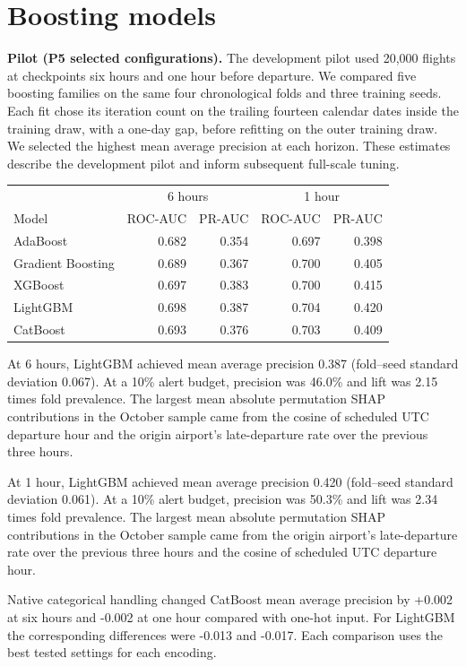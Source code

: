 \documentclass{article}
\begin{document}
\section{Boosting models}
\textbf{Pilot (P5 selected configurations).}
The development pilot used 20,000 flights at checkpoints six hours and one hour before departure. We compared five boosting families on the same four chronological folds and three training seeds. Each fit chose its iteration count on the trailing fourteen calendar dates inside the training draw, with a one-day gap, before refitting on the outer training draw. We selected the highest mean average precision at each horizon. These estimates describe the development pilot and inform subsequent full-scale tuning.

\begin{center}
\begin{tabular}{lrrrr}
 & \multicolumn{2}{c}{6 hours} & \multicolumn{2}{c}{1 hour} \\
Model & ROC-AUC & PR-AUC & ROC-AUC & PR-AUC \\ \hline
AdaBoost & 0.682 & 0.354 & 0.697 & 0.398 \\
Gradient Boosting & 0.689 & 0.367 & 0.700 & 0.405 \\
XGBoost & 0.697 & 0.383 & 0.700 & 0.415 \\
LightGBM & 0.698 & 0.387 & 0.704 & 0.420 \\
CatBoost & 0.693 & 0.376 & 0.703 & 0.409 \\
\end{tabular}
\end{center}

At 6 hours, LightGBM achieved mean average precision 0.387 (fold--seed standard deviation 0.067). At a 10\% alert budget, precision was 46.0\% and lift was 2.15 times fold prevalence. The largest mean absolute permutation SHAP contributions in the October sample came from the cosine of scheduled UTC departure hour and the origin airport's late-departure rate over the previous three hours.

At 1 hour, LightGBM achieved mean average precision 0.420 (fold--seed standard deviation 0.061). At a 10\% alert budget, precision was 50.3\% and lift was 2.34 times fold prevalence. The largest mean absolute permutation SHAP contributions in the October sample came from the origin airport's late-departure rate over the previous three hours and the cosine of scheduled UTC departure hour.

Native categorical handling changed CatBoost mean average precision by +0.002 at six hours and -0.002 at one hour compared with one-hot input. For LightGBM the corresponding differences were -0.013 and -0.017. Each comparison uses the best tested settings for each encoding.
\end{document}
